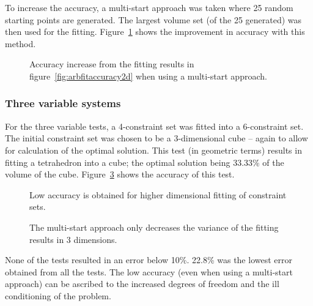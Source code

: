 To increase the accuracy, a multi-start approach was taken where 25 random starting points are generated.
The largest volume set (of the 25 generated) was then used for the fitting.
Figure~\ref{fig:arbfitaccuracy2dmulti} shows the improvement in accuracy with this method.

\begin{figure}[htbp]
  \centering
    \scalebox{1}{}
  \caption[Accuracy of constraint set fitting for 2 variables (multi-start)]{Accuracy increase from the fitting results in figure~\ref{fig:arbfitaccuracy2d} when using a multi-start approach.}
  \label{fig:arbfitaccuracy2dmulti}
\end{figure}

\subsubsection{Three variable systems}
For the three variable tests, a 4-constraint set was fitted into a 6-constraint set.
The initial constraint set was chosen to be a 3-dimensional cube -- again to allow for calculation of the optimal solution.
This test (in geometric terms) results in fitting a tetrahedron into a cube; the optimal solution being 33.33\% of the volume of the cube.
Figure~\ref{fig:arbfitaccuracy3d} shows the accuracy of this test.

\begin{figure}[htbp]
  \centering
    \scalebox{1}{}
  \caption[Accuracy of constraint set fitting for 3 variables]{Low accuracy is obtained for higher dimensional fitting of constraint sets.}
  \label{fig:arbfitaccuracy3d}
\end{figure}

\begin{figure}[htbp]
  \centering
    \scalebox{1}{}
  \caption[Accuracy of constraint set fitting for 3 variables (multi-start)]{The multi-start approach only decreases the variance of the fitting results in 3 dimensions.}
  \label{fig:arbfitaccuracy3d}
\end{figure}

None of the tests resulted in an error below 10\%.
22.8\% was the lowest error obtained from all the tests.
The low accuracy (even when using a multi-start approach) can be ascribed to the increased degrees of freedom and the ill conditioning of the problem.

